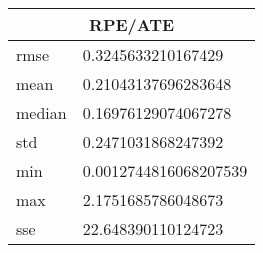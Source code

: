 \begin{table}[!ht] 
 \centering 
 \begin{tabular}{|l|l|} \hline 
 \multicolumn{2}{|c|}{RPE/ATE} \\ \hline 
 rmse & 0.3245633210167429 \\ \hline 
mean & 0.21043137696283648 \\ \hline 
median & 0.16976129074067278 \\ \hline 
std & 0.2471031868247392 \\ \hline 
min & 0.0012744816068207539 \\ \hline 
max & 2.1751685786048673 \\ \hline 
sse & 22.648390110124723 \\ \hline 
\end{tabular} 
 \end{table}